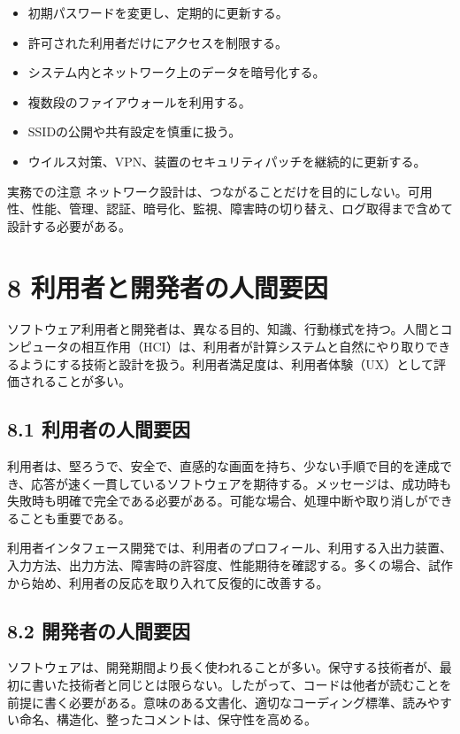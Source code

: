\documentclass[a4paper,11pt]{ltjsarticle}
\begin{document}
\begin{itemize}[leftmargin=2em]
\item 初期パスワードを変更し、定期的に更新する。
\item 許可された利用者だけにアクセスを制限する。
\item システム内とネットワーク上のデータを暗号化する。
\item 複数段のファイアウォールを利用する。
\item SSIDの公開や共有設定を慎重に扱う。
\item ウイルス対策、VPN、装置のセキュリティパッチを継続的に更新する。
\end{itemize}

\begin{importantbox}{実務での注意}
ネットワーク設計は、つながることだけを目的にしない。可用性、性能、管理、認証、暗号化、監視、障害時の切り替え、ログ取得まで含めて設計する必要がある。

\end{importantbox}

\section{8 利用者と開発者の人間要因}

ソフトウェア利用者と開発者は、異なる目的、知識、行動様式を持つ。人間とコンピュータの相互作用（HCI）は、利用者が計算システムと自然にやり取りできるようにする技術と設計を扱う。利用者満足度は、利用者体験（UX）として評価されることが多い。

\subsection{8.1 利用者の人間要因}

利用者は、堅ろうで、安全で、直感的な画面を持ち、少ない手順で目的を達成でき、応答が速く一貫しているソフトウェアを期待する。メッセージは、成功時も失敗時も明確で完全である必要がある。可能な場合、処理中断や取り消しができることも重要である。

利用者インタフェース開発では、利用者のプロフィール、利用する入出力装置、入力方法、出力方法、障害時の許容度、性能期待を確認する。多くの場合、試作から始め、利用者の反応を取り入れて反復的に改善する。

\subsection{8.2 開発者の人間要因}

ソフトウェアは、開発期間より長く使われることが多い。保守する技術者が、最初に書いた技術者と同じとは限らない。したがって、コードは他者が読むことを前提に書く必要がある。意味のある文書化、適切なコーディング標準、読みやすい命名、構造化、整ったコメントは、保守性を高める。
\end{document}

